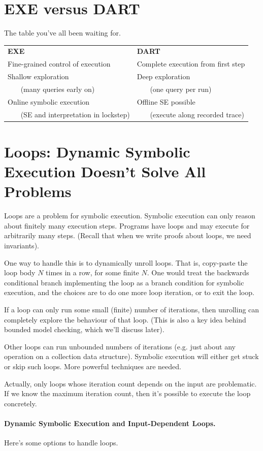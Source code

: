 \documentclass[11pt]{article}
\begin{document}
\section{EXE versus DART}
The table you've all been waiting for.

\begin{tabular}{ll}
  \textbf{EXE} & \textbf{DART} \\
  Fine-grained control of execution & Complete execution from first step \\
  Shallow exploration  & Deep exploration  \\
  ~~~ (many queries early on) & ~~~ (one query per run) \\
  Online symbolic execution  & Offline SE possible \\
  ~~~ (SE and interpretation in lockstep) & ~~~  (execute along recorded trace)
\end{tabular}

\section{Loops: Dynamic Symbolic Execution Doesn't Solve All Problems}
Loops are a problem for symbolic execution. Symbolic execution can only reason about finitely many execution steps.
Programs have loops and may execute for arbitrarily many steps.
(Recall that when we write proofs about loops, we need invariants).

One way to handle this is to dynamically unroll loops. That is,
copy-paste the loop body $N$ times in a row, for some finite $N$.  One
would treat the backwards conditional branch implementing the loop as
a branch condition for symbolic execution, and the choices are to do
one more loop iteration, or to exit the loop.

If a loop can only run some small (finite) number of iterations, then
unrolling can completely explore the behaviour of that loop.  (This is
also a key idea behind bounded model checking, which we'll discuss
later).

Other loops can run unbounded numbers of iterations (e.g. just about
any operation on a collection data structure). Symbolic execution will
either get stuck or skip such loops. More powerful techniques are
needed.

Actually, only loops whose iteration count depends on the input are
problematic. If we know the maximum iteration count, then it's
possible to execute the loop concretely.

\paragraph{Dynamic Symbolic Execution and Input-Dependent Loops.} Here's some options to handle loops.
\end{document}
